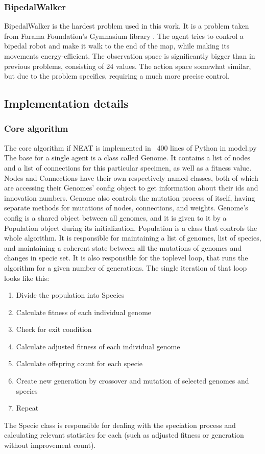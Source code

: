 \documentclass{article}
\begin{document}
        \subsubsection{BipedalWalker}
        BipedalWalker is the hardest problem used in this work. It is a problem taken from Farama Foundation's
        Gymnasium library \cite{gymnasium}. The agent tries to control a bipedal robot and make it walk to the end of the map, while
        making its movements energy-efficient. The observation space is significantly bigger than in previous problems,
        consisting of 24 values. The action space somewhat similar, but due to the problem specifics, requiring a 
        much more precise control. 
    \subsection{Implementation details}
        \subsubsection{Core algorithm}
        The core algorithm if NEAT is implemented in ~400 lines of Python in model.py
        The base for a single agent is a class called Genome. It contains a list of nodes and a list of connections for this particular 
        specimen, as well as a fitness value. Nodes and Connections have their own respectively named classes, both of which are accessing
        their Genomes' config object to get information about their ids and innovation numbers. Genome also controls the mutation process of itself,
        having separate methods for mutations of nodes, connections, and weights. Genome's config is a shared object between all genomes, and it is 
        given to it by a Population object during its initialization. Population is a class that controls the whole algorithm. It is responsible for
        maintaining a list of genomes, list of species, and maintaining a coherent state between all the mutations of genomes and changes in specie set.
        It is also responsible for the toplevel loop, that runs the algorithm for a given number of generations. The single iteration of that loop looks like this:
        \begin{enumerate}
            \item Divide the population into Species
            \item Calculate fitness of each individual genome
            \item Check for exit condition
            \item Calculate adjusted fitness of each individual genome
            \item Calculate offspring count for each specie
            \item Create new generation by crossover and mutation of selected genomes and species
            \item Repeat
        \end{enumerate}
        The Specie class is responsible for dealing with the speciation process and calculating relevant statistics for each (such as adjusted fitness or 
        generation without improvement count). 
\end{document}
